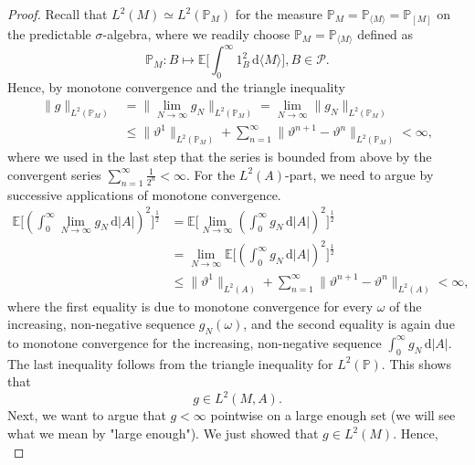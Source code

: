 \documentclass[11pt,a4paper,twoside,openany]{report}
\numberwithin{equation}{section}
\newcommand{\diff}{\mathrm{d}}
\theoremstyle{plain} %
\theoremstyle{definition} %
\theoremstyle{remark} %
\begin{document}
\begin{proof}
    
    Recall that \(L^2(M)\simeq L^2(\mathbb{P}_M)\) for the measure \(\mathbb{P}_M=\mathbb{P}_{\langle M\rangle}=\mathbb{P}_{[M]}\) on the predictable \(\sigma\)-algebra, where we readily choose \(\mathbb{P}_M=\mathbb{P}_{\langle M\rangle}\) defined as
    \begin{equation*}
    \mathbb{P}_M:B\mapsto\mathbb{E}\bigg[\int_0^{\infty}1_B^2\,\diff\langle M\rangle\bigg],B\in\mathcal{P}.
    \end{equation*}
    Hence, by monotone convergence and the triangle inequality
    \begin{align*}
        \lVert g\rVert_{L^2(\mathbb{P}_M)}
        &=\lVert \lim_{N\to\infty}g_N\rVert_{L^2(\mathbb{P}_M)}
        =\lim_{N\to\infty}\lVert g_N\rVert_{L^2(\mathbb{P}_M)}\\
        &\leq \lVert\vartheta^1\rVert_{L^2(\mathbb{P}_M)}
        +\sum_{n=1}^\infty\lVert \vartheta^{n+1}-\vartheta^n\rVert_{L^2(\mathbb{P}_M)}<\infty,
    \end{align*}
    where we used in the last step that the series is bounded from above by the convergent series \(\sum_{n=1}^\infty\frac{1}{2^n}<\infty\). For the \(L^2(A)\)-part, we need to argue by successive applications of monotone convergence.
    \begin{align*}
    \mathbb{E}\bigg[(\int_0^{\infty}\lim_{N\to\infty}g_N\,\diff|A|)^2\bigg]^{\frac{1}{2}}
    &=\mathbb{E}\bigg[\lim_{N\to\infty}(\int_0^{\infty} g_N\,\diff|A|)^2\bigg]^{\frac{1}{2}}\\
    &=\lim_{N\to\infty}\mathbb{E}\bigg[(\int_0^{\infty} g_N\,\diff|A|)^2\bigg]^{\frac{1}{2}}\\
    &\leq \lVert\vartheta^1\rVert_{L^2(A)}
    +\sum_{n=1}^{\infty}\lVert \vartheta^{n+1}-\vartheta^{n}\rVert_{L^2(A)}<\infty,
    \end{align*}
    where the first equality is due to monotone convergence for every \(\omega\) of the increasing, non-negative sequence \(g_N(\omega)\), and the second equality is again due to monotone convergence for the increasing, non-negative sequence \(\int_0^{\infty}g_N\,\diff |A|\). The last inequality follows from the triangle inequality for \(L^2(\mathbb{P})\). This shows that
    \begin{equation*}
        g\in L^2(M,A).
    \end{equation*}
    Next, we want to argue that \(g<\infty\) pointwise on a large enough set (we will see what we mean by "large enough"). We just showed that \(g\in L^2(M)\). Hence, 
    \begin{equation}\label{eq:g is P_M finite}

\end{equation}
\end{proof}
\end{document}

